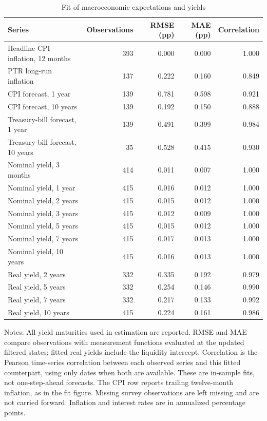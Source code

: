 \begin{table}[!htbp]
\centering
\caption{Fit of macroeconomic expectations and yields}
\label{tab:fit}
\begin{threeparttable}
\begin{tabular*}{\textwidth}{@{\extracolsep{\fill}}lrrrr}
\toprule
Series & Observations & RMSE (pp) & MAE (pp) & Correlation \\
\midrule
Headline CPI inflation, 12 months & 393 & 0.000 & 0.000 & 1.000 \\
PTR long-run inflation & 137 & 0.222 & 0.160 & 0.849 \\
CPI forecast, 1 year & 139 & 0.781 & 0.598 & 0.921 \\
CPI forecast, 10 years & 139 & 0.192 & 0.150 & 0.888 \\
Treasury-bill forecast, 1 year & 139 & 0.491 & 0.399 & 0.984 \\
Treasury-bill forecast, 10 years & 35 & 0.528 & 0.415 & 0.930 \\
Nominal yield, 3 months & 414 & 0.011 & 0.007 & 1.000 \\
Nominal yield, 1 year & 415 & 0.016 & 0.012 & 1.000 \\
Nominal yield, 2 years & 415 & 0.015 & 0.012 & 1.000 \\
Nominal yield, 3 years & 415 & 0.012 & 0.009 & 1.000 \\
Nominal yield, 5 years & 415 & 0.015 & 0.012 & 1.000 \\
Nominal yield, 7 years & 415 & 0.017 & 0.013 & 1.000 \\
Nominal yield, 10 years & 415 & 0.016 & 0.013 & 1.000 \\
Real yield, 2 years & 332 & 0.335 & 0.192 & 0.979 \\
Real yield, 5 years & 332 & 0.254 & 0.146 & 0.990 \\
Real yield, 7 years & 332 & 0.217 & 0.133 & 0.992 \\
Real yield, 10 years & 415 & 0.224 & 0.161 & 0.986 \\
\bottomrule
\end{tabular*}
\begin{tablenotes}[flushleft]
\footnotesize
\item Notes: All yield maturities used in estimation are reported. RMSE and MAE compare observations with measurement functions evaluated at the updated filtered states; fitted real yields include the liquidity intercept. Correlation is the Pearson time-series correlation between each observed series and this fitted counterpart, using only dates when both are available. These are in-sample fits, not one-step-ahead forecasts. The CPI row reports trailing twelve-month inflation, as in the fit figure. Missing survey observations are left missing and are not carried forward. Inflation and interest rates are in annualized percentage points.
\end{tablenotes}
\end{threeparttable}
\end{table}
